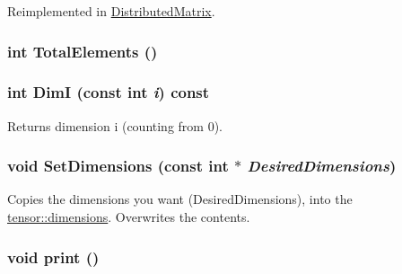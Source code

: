 Reimplemented in \hyperlink{classJKBuilder_1_1DistributedMatrix_a6a378face23ba83b2431cb08e8519066}{DistributedMatrix}.\hypertarget{classJKBuilder_1_1tensor_a537b2f14296e2f0e62f00e1703c5fa08}{
\subsubsection[{TotalElements}]{\setlength{\rightskip}{0pt plus 5cm}int TotalElements ()}}
\label{classJKBuilder_1_1tensor_a537b2f14296e2f0e62f00e1703c5fa08}
\hypertarget{classJKBuilder_1_1tensor_a6bdcfca6493bc217b607317dbceb28b2}{
\subsubsection[{DimI}]{\setlength{\rightskip}{0pt plus 5cm}int DimI (const int {\em i}) const}}
\label{classJKBuilder_1_1tensor_a6bdcfca6493bc217b607317dbceb28b2}


Returns dimension i (counting from 0). \hypertarget{classJKBuilder_1_1tensor_ace6bcf62c74395ab9e37abc4935f66e0}{
\subsubsection[{SetDimensions}]{\setlength{\rightskip}{0pt plus 5cm}void SetDimensions (const int $\ast$ {\em DesiredDimensions})}}
\label{classJKBuilder_1_1tensor_ace6bcf62c74395ab9e37abc4935f66e0}


Copies the dimensions you want (DesiredDimensions), into the \hyperlink{classJKBuilder_1_1tensor_a2ce1e6e0782ddee097f2c4aa2663d3e9}{tensor::dimensions}. Overwrites the contents. \hypertarget{classJKBuilder_1_1tensor_a388f572c62279f839ee138a9afbdeeb5}{
\subsubsection[{print}]{\setlength{\rightskip}{0pt plus 5cm}void print ()}}
\label{classJKBuilder_1_1tensor_a388f572c62279f839ee138a9afbdeeb5}


